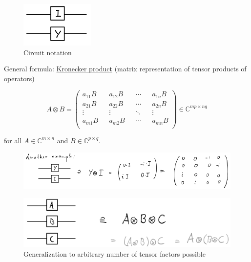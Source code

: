 \begin{figure}[H]
    \centering
    \includegraphics[scale=0.5]{chapters/res/parallel-circuit-i-y.png}
    \caption{Circuit notation}
\end{figure}

General formula: \underline{Kronecker product} (matrix representation of tensor products of operators)

\begin{equation}
    A \otimes B = \begin{pmatrix*}
        a_{11} B && a_{12} B && \cdots && a_{1n} B \\
        a_{21} B && a_{22} B && \cdots && a_{2n} B \\
        \vdots && \vdots && \ddots && \vdots \\
        a_{m1} B && a_{m2} B && \cdots && a_{mn} B \\
    \end{pmatrix*} \in
    \mathbb{C}^{mp \times nq} 
\end{equation}

for all $ A \in \mathbb{C}^{m \times n}$ and $B \in \mathbb{C}^{p \times q}$.

\begin{figure}[H]
    \centering
    \includegraphics[scale=0.48]{chapters/res/kronecker-another-example.png}
\end{figure}

\begin{figure}[H]
    \centering
    \includegraphics[scale=0.5]{chapters/res/kronecker-generlization-3-tensors.png}
    \caption{Generalization to arbitrary number of tensor factors possible}
\end{figure}

